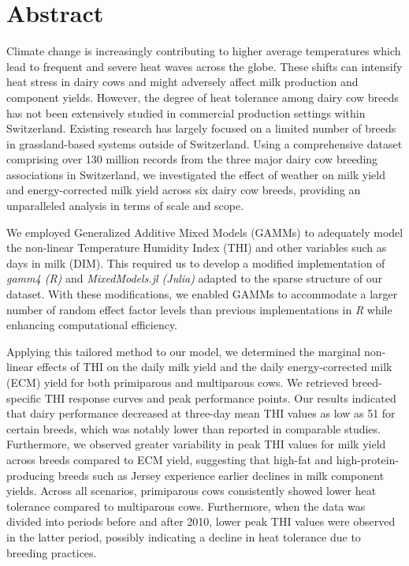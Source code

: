\chapter{Abstract}
Climate change is increasingly contributing to higher average temperatures which lead to frequent and severe heat waves across the globe. These shifts can intensify heat stress in dairy cows and might adversely affect milk production and component yields. However, the degree of heat tolerance among dairy cow breeds has not been extensively studied in commercial production settings within Switzerland. Existing research has largely focused on a limited number of breeds in grassland-based systems outside of Switzerland. Using a comprehensive dataset comprising over 130 million records from the three major dairy cow breeding associations in Switzerland, we investigated the effect of weather on milk yield and energy-corrected milk yield across six dairy cow breeds, providing an unparalleled analysis in terms of scale and scope.

\vspace*{\baselineskip}
We employed Generalized Additive Mixed Models (GAMMs) to adequately model the non-linear Temperature Humidity Index (THI) and other variables such as days in milk (DIM). This required us to develop a modified implementation of \textit{gamm4 (R)} and \textit{MixedModels.jl (Julia)} adapted to the sparse structure of our dataset. With these modifications, we enabled GAMMs to accommodate a larger number of random effect factor levels than previous implementations in \textit{R} while enhancing computational efficiency.

\vspace*{\baselineskip}
Applying this tailored method to our model, we determined the marginal non-linear effects of THI on the daily milk yield and the daily energy-corrected milk (ECM) yield for both primiparous and multiparous cows. We retrieved breed-specific THI response curves and peak performance points. Our results indicated that dairy performance decreased at three-day mean THI values as low as 51 for certain breeds, which was notably lower than reported in comparable studies. Furthermore, we observed greater variability in peak THI values for milk yield across breeds compared to ECM yield, suggesting that high-fat and high-protein-producing breeds such as Jersey experience earlier declines in milk component yields. Across all scenarios, primiparous cows consistently showed lower heat tolerance compared to multiparous cows. Furthermore, when the data was divided into periods before and after 2010, lower peak THI values were observed in the latter period, possibly indicating a decline in heat tolerance due to breeding practices.

